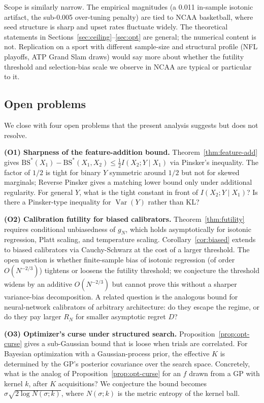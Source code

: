 \documentclass[11pt,a4paper]{article}
\theoremstyle{definition}
\DeclareMathOperator{\Var}{Var}
\newcommand{\BS}{\mathrm{BS}}
\begin{document}
Scope is similarly narrow. The empirical magnitudes (a 0.011 in-sample isotonic artifact, the sub-0.005 over-tuning penalty) are tied to NCAA basketball, where seed structure is sharp and upset rates fluctuate widely. The theoretical statements in Sections~\ref{sec:ceiling}--\ref{sec:opt} are general; the numerical content is not. Replication on a sport with different sample-size and structural profile (NFL playoffs, ATP Grand Slam draws) would say more about whether the futility threshold and selection-bias scale we observe in NCAA are typical or particular to it.

\subsection{Open problems}\label{sec:open}

We close with four open problems that the present analysis suggests but does not resolve.

\textbf{(O1) Sharpness of the feature-addition bound.} Theorem~\ref{thm:feature-add} gives $\BS^*(X_1) - \BS^*(X_1, X_2) \le \frac{1}{2} I(X_2; Y \mid X_1)$ via Pinsker's inequality. The factor of $1/2$ is tight for binary $Y$ symmetric around $1/2$ but not for skewed marginals; Reverse Pinsker gives a matching lower bound only under additional regularity. For general $Y$, what is the tight constant in front of $I(X_2; Y \mid X_1)$? Is there a Pinsker-type inequality for $\Var(Y)$ rather than KL?

\textbf{(O2) Calibration futility for biased calibrators.} Theorem~\ref{thm:futility} requires conditional unbiasedness of $g_N$, which holds asymptotically for isotonic regression, Platt scaling, and temperature scaling. Corollary~\ref{cor:biased} extends to biased calibrators via Cauchy-Schwarz at the cost of a larger threshold. The open question is whether finite-sample bias of isotonic regression (of order $O(N^{-2/3})$) tightens or loosens the futility threshold; we conjecture the threshold widens by an additive $O(N^{-2/3})$ but cannot prove this without a sharper variance-bias decomposition. A related question is the analogous bound for neural-network calibrators of arbitrary architecture: do they escape the regime, or do they pay larger $R_N$ for smaller asymptotic regret $D$?

\textbf{(O3) Optimizer's curse under structured search.} Proposition~\ref{prop:opt-curse} gives a sub-Gaussian bound that is loose when trials are correlated. For Bayesian optimization with a Gaussian-process prior, the effective $K$ is determined by the GP's posterior covariance over the search space. Concretely, what is the analog of Proposition~\ref{prop:opt-curse} for an $f$ drawn from a GP with kernel $k$, after $K$ acquisitions? We conjecture the bound becomes $\sigma \sqrt{2 \log N(\sigma; k)}$, where $N(\sigma; k)$ is the metric entropy of the kernel ball.
\end{document}
